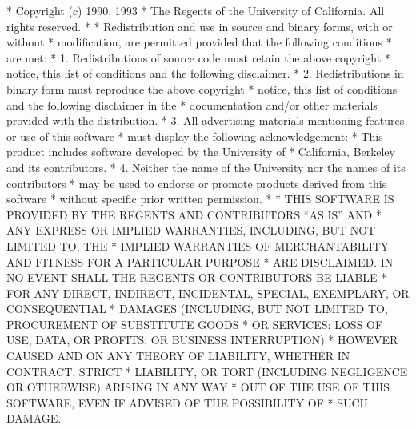 \begin{copyrightEnv}
 * Copyright (c) 1990, 1993
 *      The Regents of the University of California.  All rights reserved.
 *
 * Redistribution and use in source and binary forms, with or without
 * modification, are permitted provided that the following conditions
 * are met:
 * 1. Redistributions of source code must retain the above copyright
 *    notice, this list of conditions and the following disclaimer.
 * 2. Redistributions in binary form must reproduce the above copyright
 *    notice, this list of conditions and the following disclaimer in the
 *    documentation and/or other materials provided with the distribution.
 * 3. All advertising materials mentioning features or use of this software
 *    must display the following acknowledgement:
 *      This product includes software developed by the University of
 *      California, Berkeley and its contributors.
 * 4. Neither the name of the University nor the names of its contributors
 *    may be used to endorse or promote products derived from this software
 *    without specific prior written permission.
 *
 * THIS SOFTWARE IS PROVIDED BY THE REGENTS AND CONTRIBUTORS ``AS IS'' AND
 * ANY EXPRESS OR IMPLIED WARRANTIES, INCLUDING, BUT NOT LIMITED TO, THE
 * IMPLIED WARRANTIES OF MERCHANTABILITY AND FITNESS FOR A PARTICULAR PURPOSE
 * ARE DISCLAIMED.  IN NO EVENT SHALL THE REGENTS OR CONTRIBUTORS BE LIABLE
 * FOR ANY DIRECT, INDIRECT, INCIDENTAL, SPECIAL, EXEMPLARY, OR CONSEQUENTIAL
 * DAMAGES (INCLUDING, BUT NOT LIMITED TO, PROCUREMENT OF SUBSTITUTE GOODS
 * OR SERVICES; LOSS OF USE, DATA, OR PROFITS; OR BUSINESS INTERRUPTION)
 * HOWEVER CAUSED AND ON ANY THEORY OF LIABILITY, WHETHER IN CONTRACT, STRICT
 * LIABILITY, OR TORT (INCLUDING NEGLIGENCE OR OTHERWISE) ARISING IN ANY WAY
 * OUT OF THE USE OF THIS SOFTWARE, EVEN IF ADVISED OF THE POSSIBILITY OF
 * SUCH DAMAGE.
\end{copyrightEnv}

